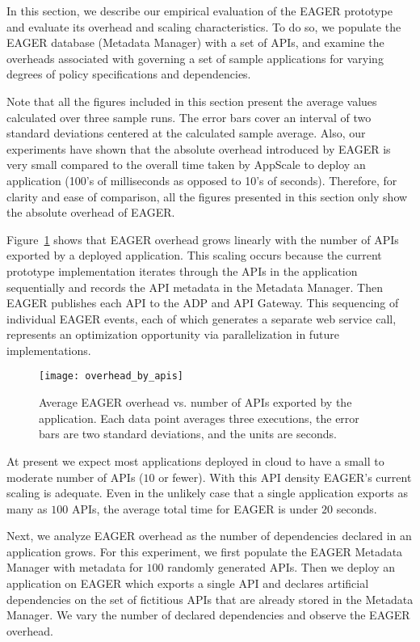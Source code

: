 In this section, we describe our empirical evaluation of the EAGER
prototype and evaluate its overhead and scaling characteristics.
To do so, we populate the EAGER database (Metadata Manager) with a 
set of APIs, and examine
the overheads associated with governing a set of sample applications 
for varying degrees of policy specifications and dependencies.

Note that all the figures included in this section present the average values calculated
over three sample runs. The error bars cover an interval of two standard deviations centered
at the calculated sample average. Also, our experiments have shown that the absolute
overhead introduced by EAGER is very small compared to the overall time taken by
AppScale to deploy an application (100's of milliseconds as opposed
to 10's of seconds). Therefore, for clarity and ease of comparison, all the figures presented 
in this section only show the absolute overhead of EAGER.

Figure~\ref{fig:overhead_by_apis} shows that EAGER overhead grows linearly
with the number of APIs exported by a deployed application.  This scaling occurs
because the current prototype implementation iterates through the APIs in the
application sequentially and records the API metadata in the Metadata Manager.
Then EAGER publishes each API to the ADP and API Gateway. This sequencing of
individual EAGER events, each of which generates a separate web service call,
represents an optimization opportunity via parallelization in future implementations.

\begin{figure}
\centering
\texttt{[image: overhead\_by\_apis]}
\caption{Average EAGER overhead vs. number of APIs exported by the
application.  Each data point averages three executions, the error bars 
are two standard deviations, and the units are seconds.}
\label{fig:overhead_by_apis}
\vspace{-0.2in}
\end{figure}

At present we expect most applications deployed in cloud to have a small to 
moderate number of APIs ($10$ or fewer).  With this API density EAGER's current 
scaling is adequate.  Even in the
unlikely case that a single application exports as many as $100$ APIs,
the average total time for EAGER is under $20$ seconds.

Next, we analyze EAGER overhead as the number of dependencies declared in
an application grows. For this experiment, we first populate the EAGER
Metadata Manager with metadata for $100$ randomly 
generated APIs.
Then we
deploy an application on EAGER which exports a single API and declares
artificial dependencies on the set of fictitious 
APIs that are already stored in the Metadata Manager. We
vary the number of declared dependencies and observe the EAGER overhead.

